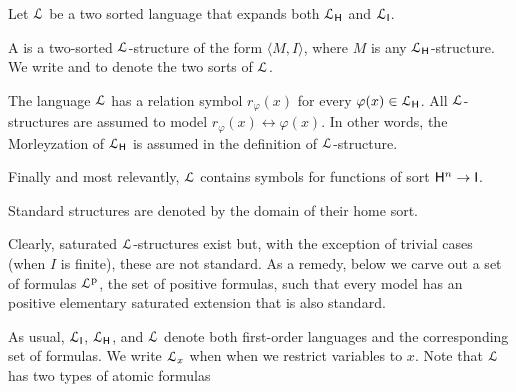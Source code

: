 \documentclass{amsproc}
\renewcommand*{\emph}[1]{%
   \smash{\tikz[baseline]\node[rectangle, fill=teal!25, rounded corners, inner xsep=0.5ex, inner ysep=0.2ex, anchor=base, minimum height = 2.7ex]{\strut #1};}}
\begin{document}
\begin{definition}\label{def_0}
  Let ${\EuScript L}$ be a two sorted language that expands both ${\EuScript L}_{\sf H}$ and ${\EuScript L}_{\sf I}$.

  A \emph{standard structure\/} is a two-sorted ${\EuScript L}$-structure of the form $\langle M,I\rangle$, where $M$ is any ${\EuScript L}_{\sf H}$-structure.
  We write \emph{${\sf H}$} and \emph{${\sf I}$\/} to denote the two sorts of ${\EuScript L}$.
  
  The language ${\EuScript L}$ has a relation symbol $r_{\varphi}(x)$ for every $\varphi(x)\in {\EuScript L}_{\sf H}$.
  All ${\EuScript L}$-structures are assumed to model $r_{\varphi}(x)\leftrightarrow\varphi(x)$. 
  In other words, the Morleyzation of ${\EuScript L}_{\sf H}$ is assumed in the definition of ${\EuScript L}$-structure.
  
  Finally and most relevantly, ${\EuScript L}$ contains symbols for functions of sort ${\sf H}^n\to {\sf I}$.

  Standard structures are denoted by the domain of their home sort.
\end{definition}


Clearly, saturated ${\EuScript L}$-structures exist but, with the exception of trivial cases (when $I$ is finite), these are not standard.
As a remedy, below we carve out a set of formulas ${\EuScript L}^{\rm p}$, the set of positive formulas, such that every model has an positive elementary saturated extension that is also standard.

As usual, ${\EuScript L}_{\sf I}$, ${\EuScript L}_{\sf H}$, and ${\EuScript L}$ denote both first-order languages and the corresponding set of formulas.
We write ${\EuScript L}_x$ when when we restrict variables to $x$.
Note that ${\EuScript L}$ has two types of atomic formulas
\end{document}
